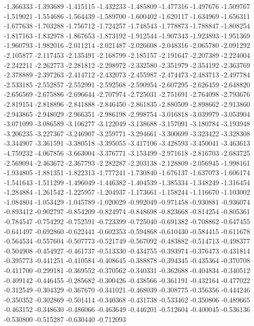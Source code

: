 -1.366333
-1.393689
-1.415115
-1.432233
-1.485809
-1.477316
-1.497676
-1.509767
-1.519021
-1.554686
-1.564439
-1.589700
-1.600402
-1.620117
-1.634969
-1.656311
-1.677638
-1.703288
-1.756712
-1.724257
-1.748543
-1.778873
-1.788847
-1.808254
-1.817163
-1.832978
-1.867653
-1.873192
-1.912544
-1.907343
-1.923893
-1.951369
-1.960793
-1.982016
-2.011214
-2.021487
-2.026608
-2.048316
-2.065780
-2.091292
-2.105877
-2.117453
-2.135491
-2.168799
-2.185157
-2.191647
-2.207389
-2.224004
-2.242211
-2.262773
-2.281812
-2.298972
-2.332580
-2.351979
-2.354192
-2.363769
-2.378889
-2.397263
-2.414712
-2.432073
-2.455987
-2.474473
-2.483713
-2.497784
-2.533185
-2.552857
-2.552991
-2.592568
-2.590954
-2.607295
-2.626459
-2.648820
-2.656569
-2.675886
-2.696644
-2.707974
-2.725031
-2.751691
-2.764098
-2.793676
-2.819154
-2.818896
-2.841888
-2.846450
-2.861835
-2.880509
-2.898662
-2.913860
-2.943865
-2.948029
-2.966351
-2.986198
-2.998754
-3.016818
-3.039979
-3.053904
-3.071099
-3.086589
-3.106277
-3.122049
-3.138688
-3.157091
-3.180784
-3.193948
-3.206235
-3.227367
-3.246907
-3.259771
-3.294661
-3.300699
-3.323422
-3.328308
-3.344907
-3.361591
-3.380518
-3.395055
-3.417106
-3.428593
-3.450041
-3.463613
-4.759232
-4.067856
-3.663004
-3.376771
-3.153499
-2.971618
-2.816703
-2.683725
-2.569094
-2.463672
-2.367793
-2.282287
-2.203138
-2.128809
-2.056945
-1.998161
-1.934805
-1.881351
-1.822313
-1.777241
-1.730840
-1.676137
-1.637073
-1.606174
-1.541643
-1.511299
-1.496049
-1.446382
-1.404539
-1.385334
-1.348249
-1.316454
-1.284884
-1.261542
-1.225957
-1.204937
-1.173661
-1.158244
-1.116670
-1.103002
-1.084804
-1.053429
-1.045789
-1.020029
-0.992049
-0.971458
-0.930881
-0.936074
-0.893412
-0.902797
-0.854209
-0.824974
-0.848698
-0.823668
-0.814254
-0.805361
-0.784547
-0.754292
-0.752591
-0.723399
-0.725040
-0.691382
-0.708862
-0.647455
-0.641497
-0.692860
-0.622441
-0.602353
-0.594868
-0.610430
-0.584415
-0.611678
-0.564534
-0.557604
-0.507773
-0.521749
-0.567092
-0.483882
-0.514713
-0.498377
-0.504908
-0.454927
-0.461737
-0.513330
-0.434755
-0.393974
-0.376473
-0.431814
-0.395773
-0.441251
-0.410584
-0.408645
-0.388878
-0.394345
-0.435364
-0.370708
-0.411700
-0.299181
-0.369552
-0.370562
-0.340331
-0.362688
-0.404834
-0.340512
-0.409142
-0.446455
-0.285682
-0.300426
-0.438566
-0.361191
-0.432164
-0.477022
-0.312549
-0.304329
-0.367670
-0.341021
-0.468039
-0.308775
-0.356356
-0.444246
-0.350352
-0.302869
-0.501414
-0.340368
-0.431738
-0.533462
-0.350806
-0.489665
-0.463152
-0.348630
-0.486066
-0.463649
-0.446201
-0.512604
-0.400045
-0.536136
-0.530800
-0.515287
-0.630440
-0.712093
